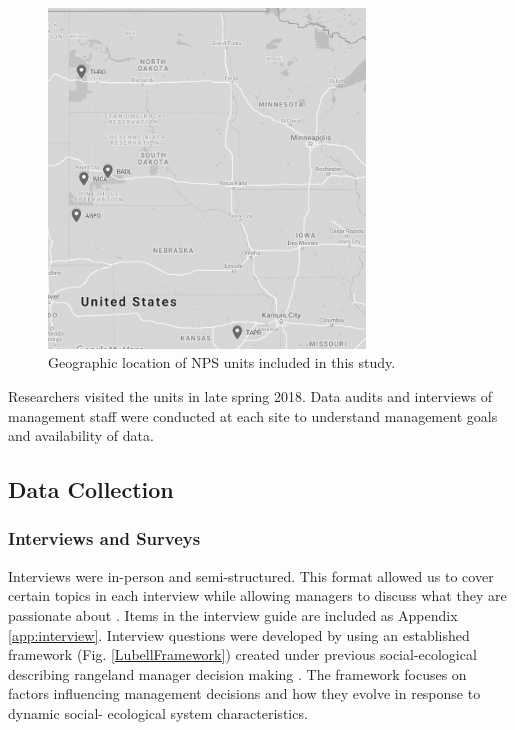 \begin{figure}[th]
	\centering
\includegraphics[width=0.75\textwidth]{figures/RegionMapGoogle.png}
\caption[Map of Midwest NPS units.]
	{Geographic location of NPS units included in this study.} 
\label{RegionMap}
\end{figure}

Researchers visited the units in late spring 2018. 
Data audits and interviews of management staff were conducted at each site to understand management goals and availability of data.

\hypertarget{data-collection}{%
	\subsection{Data Collection}\label{data-collection}}

\subsubsection{Interviews and Surveys} 
Interviews were in-person and semi-structured. 
This format allowed us to cover certain topics in each
interview while allowing managers to discuss what they are passionate about \citep{creswell2003, montello2012}. 
Items in the interview guide are included as Appendix \ref{app:interview}. Interview questions were developed by using an established framework (Fig. \ref{LubellFramework}) created under previous social-ecological describing rangeland manager decision making \citep{lubell2013}. 
The framework focuses on factors influencing management decisions and how they evolve in response to dynamic social- ecological system characteristics.

